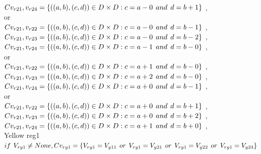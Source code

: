 \\$C{v_{r21},v_{r24}}=\{((a,b),(c,d))\in D\times D: c = a - 0\hspace{1ex} and \hspace{1ex}  d = b + 1 \}$ , 
\\or
\\$C{v_{r21},v_{r22}}=\{((a,b),(c,d))\in D\times D: c = a - 0\hspace{1ex} and \hspace{1ex}  d = b - 1 \}$ , 
\\$C{v_{r21},v_{r23}}=\{((a,b),(c,d))\in D\times D: c = a - 0\hspace{1ex} and \hspace{1ex}  d = b - 2 \}$ , 
\\$C{v_{r21},v_{r24}}=\{((a,b),(c,d))\in D\times D: c = a - 1\hspace{1ex} and \hspace{1ex}  d = b - 0 \}$ , 
\\or
\\$C{v_{r21},v_{r22}}=\{((a,b),(c,d))\in D\times D: c = a + 1\hspace{1ex} and \hspace{1ex}  d = b - 0 \}$ , 
\\$C{v_{r21},v_{r23}}=\{((a,b),(c,d))\in D\times D: c = a + 2\hspace{1ex} and \hspace{1ex}  d = b - 0 \}$ , 
\\$C{v_{r21},v_{r24}}=\{((a,b),(c,d))\in D\times D: c = a + 0\hspace{1ex} and \hspace{1ex}  d = b - 1 \}$ , 
\\or
\\$C{v_{r21},v_{r22}}=\{((a,b),(c,d))\in D\times D: c = a + 0\hspace{1ex} and \hspace{1ex}  d = b + 1 \}$ , 
\\$C{v_{r21},v_{r23}}=\{((a,b),(c,d))\in D\times D: c = a + 0\hspace{1ex} and \hspace{1ex}  d = b + 2 \}$ , 
\\$C{v_{r21},v_{r24}}=\{((a,b),(c,d))\in D\times D: c = a + 1\hspace{1ex} and \hspace{1ex}  d = b + 0 \}$ , 
\\ Yellow reg1 
\\$if\hspace{1ex} V_{ry1} \neq None, Cv_{ry1}= \{V_{ry1}=V_{y11} \hspace{1ex} or \hspace{1ex} V_{ry1}=V_{y21} \hspace{1ex} or \hspace{1ex} V_{ry1}=V_{y22} \hspace{1ex} or \hspace{1ex} V_{ry1}=V_{y24} \}$
